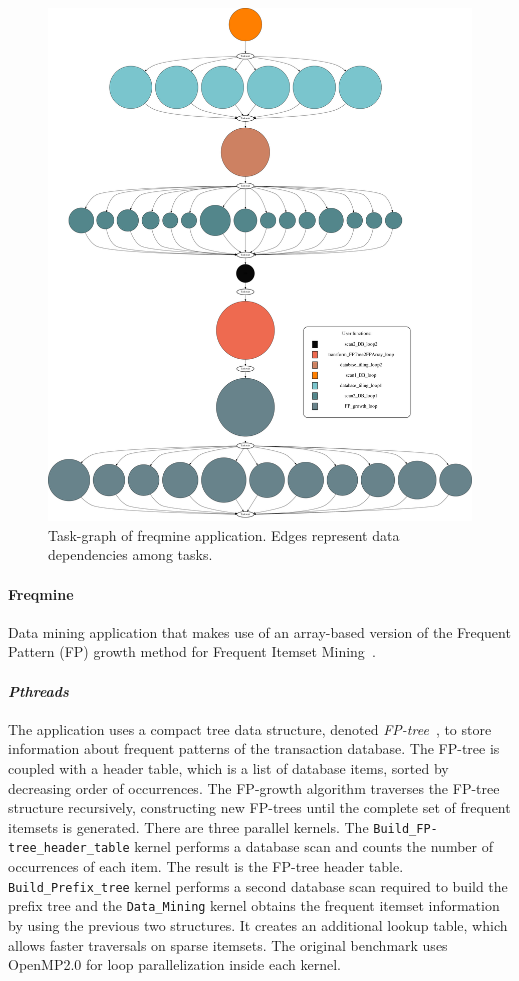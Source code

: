 {\begin{figure}[t!]%
	\center
	\includegraphics[width=.8\columnwidth]{task_benchmarks/figures/freqmine_taskgraph}%
	\caption{Task-graph of freqmine application.  Edges represent data dependencies among
tasks.}
	\label{fig:freqmine_tg}%
	\vspace{.5cm}
\end{figure}

\paragraph{\textbf{Freqmine}}
Data mining application that makes use of an array-based version of the Frequent Pattern
(FP) growth method for Frequent Itemset Mining~\cite{conf/fimi/GrahneZ03}.

\paragraph{\textit{Pthreads}}
The application uses a compact tree data structure, denoted \emph{FP-tree}~\cite{Han:2000:MFP:335191.335372}, to store information about frequent patterns of the transaction database.  The FP-tree is coupled with a header table, which is a list of database items, sorted by decreasing order of occurrences.
The FP-growth algorithm traverses the FP-tree structure recursively, constructing new FP-trees until the complete set of frequent itemsets is generated.
There are three parallel kernels.  The \texttt{Build\_FP-tree\_header\_table} kernel performs a database scan 
and counts the number of occurrences of each item.  The result is the FP-tree header table.   
\texttt{Build\_Prefix\_tree} kernel performs a second database scan required to build the prefix tree
and the \texttt{Data\_Mining} kernel obtains the frequent itemset information by using the previous two structures.  It creates
an additional lookup table, which allows faster traversals on sparse itemsets.
The original \PARSEC{} benchmark uses OpenMP2.0 for loop parallelization inside each kernel.  

}
